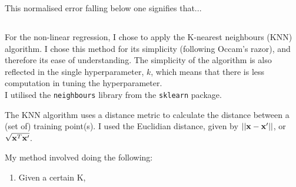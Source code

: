 \documentclass{scrartcl}
\begin{document}
This normalised error falling below one signifies that...

\subsection{}

For the non-linear regression, I chose to apply the K-nearest neighbours (KNN) algorithm. I chose this method for its simplicity (following Occam's razor), and therefore its ease of understanding. The simplicity of the algorithm is also reflected in the single hyperparameter, $k$, which means that there is less computation in tuning the hyperparameter. \\

I utilised the \texttt{neighbours} library from the \texttt{sklearn} package.

The KNN algorithm uses a distance metric to calculate the distance between a (set of) training point(s). I used the Euclidian distance, given by $ || {\mathbf x} - {\mathbf x}' || $, or $ \sqrt {{\mathbf x}^T {\mathbf x}' } $.

My method involved doing the following:
\begin{enumerate}
    \item Given a certain K,
\end{enumerate}

%
\end{document}
